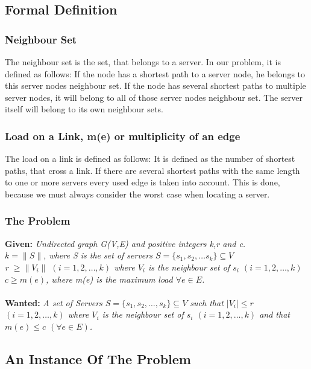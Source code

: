 \documentclass [12pt]{article}
\begin{document}
\subsection{Formal Definition}
\subsubsection{Neighbour Set}
The neighbour set is the set, that belongs to a server. In our problem, it is
defined as follows: If the node has a shortest path to a server node, he 
belongs to this server nodes neighbour set. If the node has several shortest
paths to multiple server nodes, it will belong to all of those server nodes neighbour
set. The server itself will belong to its own neighbour sets.
\subsubsection{Load on a Link, m(e) or multiplicity of an edge}
The load on a link is defined as follows: 
It is defined as the number of shortest paths, that cross a link. If there
are several shortest paths with the same length to one or more servers every
used edge is taken into account. This is done, because we must always consider
the worst case when locating a server.
\subsubsection{The Problem}
\textbf{Given:}
{\itshape Undirected graph G(V,E) and  positive integers k,r and c. \\
    $k = \|S\|$, where S is the set of servers $S = \{s_1,s_2,\dots s_k\} \subseteq V$\\
    r $\geq  \|V_i\|$ $(i=1,2,\dots,k)$ where $V_i$ is the neighbour set of $s_i$ $(i=1,2,\dots,k)$\\
$c \geq m(e)$, where m(e) is the maximum load $\forall e \in E$.} \\
\\
\textbf{Wanted:} 
{\itshape A set of Servers $S = \{s_1, s_2,\dots, s_k \} \subseteq V$ such that $|V_i|\leq r$
    $(i = 1,2, \dots,k)$ where $V_i$ is the neighbour set of $s_i$  $(i = 1,2,\dots,k)$ and that
$m(e) \leq c$ $(\forall e \in E)$.}

\subsection{An Instance Of The Problem}
\indent
\indent
\indent
\end{document}
